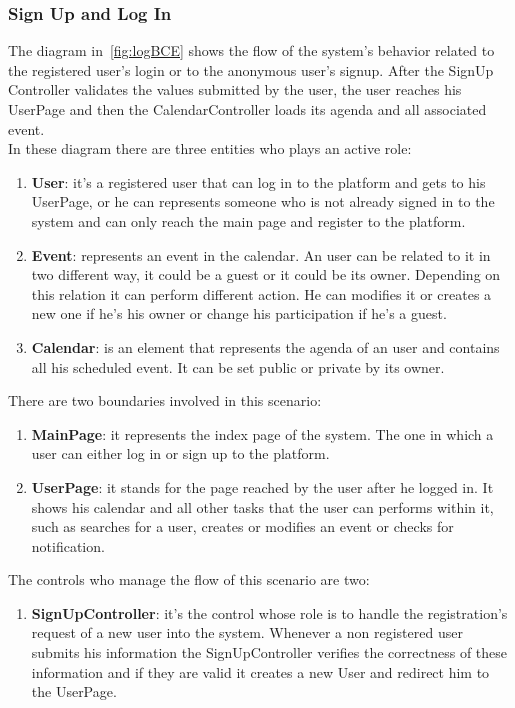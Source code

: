 \begin{itemize}
\subsubsection{Sign Up and Log In }
The diagram in~\ref{fig:logBCE} shows the flow of the system's behavior related to the registered user's login or to the anonymous user's signup. After the SignUp Controller validates the values submitted by the user, the user reaches his UserPage and then the CalendarController loads its agenda and all associated event. \\In these diagram there are three entities who plays an active role:
\begin{enumerate}
\item  {\bf User}: it's a registered user that can log in to the platform and gets to his UserPage, or he can  represents someone who is not already signed in  to the system and can only reach the main page and register to the platform.
\item  {\bf Event}: represents an event in the calendar. An user can be related to it in two different way, it could be a guest or it could be its owner. Depending on this relation it can perform different action. He can modifies it or creates a new one if he's his owner or change his participation if he's a guest.
\item  {\bf Calendar}: is an element that represents the agenda of an user and contains all his scheduled event. It can be set public or private by its owner.
\end{enumerate}
There are two boundaries involved in this scenario: \begin{enumerate}
\item  {\bf MainPage}: it represents the index page of the system. The one in which a user can either log in or sign up to the platform.
\item  {\bf UserPage}: it stands for the page reached by the user after he logged in. It shows his calendar and all other tasks that the user can performs within it, such as searches for a user, creates or modifies an event or checks for notification.
 \end{enumerate}
The controls who manage the flow of this scenario are two:\begin{enumerate}
\item  {\bf SignUpController}: it's the control whose role is to handle the registration's request of a new user into the system. Whenever a non registered user submits his information the SignUpController verifies the correctness of these information and if they are valid it creates a new User and redirect him to the UserPage.

\end{enumerate}
\end{itemize}
